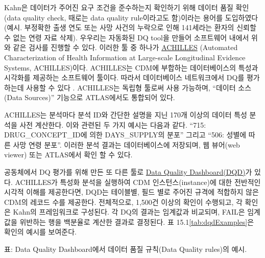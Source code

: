 \documentclass[11pt]{book}
\theoremstyle{definition}
\theoremstyle{definition}
\theoremstyle{definition}
\theoremstyle{remark}
\begin{document}
 

Kahn은 데이터가 주어진 요구 조건을 준수하는지 확인하기 위해 데이터 품질
확인 (data quality check, 때로는 data quality rule이라고도 함)이라는
용어를 도입하였다 (예시. 부정확한 출생 연도 또는 사망 사건의 누락으로
인해 141세라는 환자의 신뢰할 수 없는 연령 자료 삭제). 우우리는 자동화된
DQ tool을 만들어 소프트웨어 내에서 위와 같은 검사를 진행할 수 있다.
이러한 툴 중 하나가 \href{https://github.com/OHDSI/Achilles}{ACHILLES}
(Automated Characterization of Health Information at Large-scale
Longitudinal Evidence Systems, ACHILLES)이다. \citep{huser_methods_2018}
ACHILLES는 CDM에 부합하는 데이터베이스의 특성과 시각화를 제공하는
소프트웨어 툴이다. 따라서 데이터베이스 네트워크에서 DQ를 평가하는데
사용할 수 있다 \citep{huser_multisite_2016}. ACHILLES는 독립형 툴로써
사용 가능하며, ``데이터 소스(Data Sources)'' 기능으로 ATLAS에서도
통합되어 있다.  

ACHILLES는 분석마다 분석 ID와 간단한 설명을 지닌 170개 이상의 데이터
특성 분석을 사전 계산한다. 이와 관련된 두 가지 예시는 다음과 같다.
``715: DRUG\_CONCEPT\_ID에 의한 DAYS\_SUPPLY의 분포'' 그리고 ``506:
성별에 따른 사망 연령 분포''. 이러한 분석 결과는 데이터베이스에
저장되며, 웹 뷰어(web viewer) 또는 ATLAS에서 확인 할 수 있다.


공동체에서 DQ 평가를 위해 만든 또 다른 툴로
\href{https://github.com/OHDSI/DataQualityDashboard}{Data Quality
Dashboard(DQD)}가 있다. ACHILLES가 특성화 분석을 실행하여 CDM
인스턴스(instance)에 대한 전반적인 시각적 이해를 제공한다면, DQD는
테이블별, 필드 별로 주어진 규격에 적합하지 않은 CDM의 레코드 수를
제공한다. 전체적으로, 1,500건 이상의 확인이 수행되고, 각 확인은 Kahn의
프레임워크로 구성된다. 각 DQ의 결과는 임계값과 비교되며, FAIL은 임계값을
위반하는 행을 백분율로 계산한 결과로 결정된다. 표
15.1\ref{tab:dqdExamples}은 확인의 예시를 보여준다.

표: \label{tab:dqdExamples} Data Quality Dashboard에서 데이터 품질 규칙(Data
Quality rules)의 예시.
\end{document}
